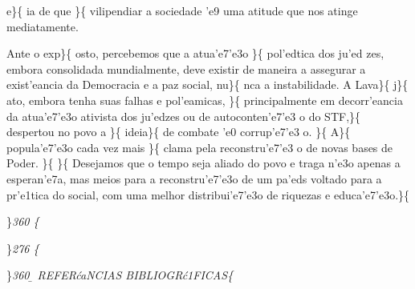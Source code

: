  e\}\{\rtlch{}  \ltrch{}
 ia de que \}\{\rtlch{} 
\ltrch{}  vilipendiar a sociedade 'e9
uma atitude que nos atinge mediatamente. \par Ante o exp\}\{\rtlch{}
 \ltrch{}  osto, percebemos que a atua'e7'e3o
\}\{\rtlch{}  \ltrch{} 
pol'edtica dos ju'ed zes, embora consolidada mundialmente, deve existir
de maneira a assegurar a exist'eancia da Democracia e a paz social,
nu\}\{\rtlch{}  \ltrch{}  nca a instabilidade.
A Lava\}\{\rtlch{}  \ltrch{}  j\}\{ \rtlch{}
 \ltrch{}  ato, embora tenha suas
falhas e pol'eamicas, \}\{\rtlch{}  \ltrch{} 
principalmente em decorr'eancia da atua'e7'e3o ativista dos ju'edzes ou
de autoconten'e7'e3 o do STF,\}\{\rtlch{}  \ltrch{}
 despertou no povo a \}\{\rtlch{} 
\ltrch{}  ideia\}\{\rtlch{} 
\ltrch{}  de combate 'e0 corrup'e7'e3
o. \}\{\rtlch{}  \ltrch{} 
A\}\{\rtlch{}  \ltrch{} 
popula'e7'e3o cada vez mais \}\{\rtlch{}  \ltrch{}
 clama pela reconstru'e7'e3 o de novas
bases de Poder. \}\{\rtlch{}  \ltrch{}
 \}\{\rtlch{}  \ltrch{}
 Desejamos que o tempo seja aliado do
povo e traga n'e3o apenas a esperan'e7a, mas meios para a
reconstru'e7'e3o de um pa'eds voltado para a pr'e1tica do social, com
uma melhor distribui'e7'e3o de riquezas e educa'e7'e3o.\}\{\rtlch{}
 \ltrch{} 
\par \}\pard \ltrpar\qj {}\sl360\widctlpar\wrapdefault\aspalpha\aspnum\faauto\adjustright{} \{\rtlch{}
 \ltrch{}  \par 
\par \}\pard \ltrpar\ql {}\sl276\widctlpar\wrapdefault\aspalpha\aspnum\faauto\adjustright{} \{\rtlch{}
 \ltrch{}  \page 
\par \}\pard \ltrpar\qc {}\sl360\widctlpar\wrapdefault\aspalpha\aspnum\faauto\adjustright{} {\rtlch{} \ab{} \ltrch{} \b{} REFER\'caNCIAS BIBLIOGR\'c1FICAS}\{
